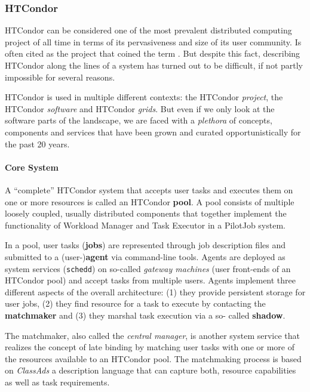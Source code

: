 \documentclass{sig-alternate}
\begin{document}
%
\subsubsection{HTCondor}

HTCondor can be considered one of the most prevalent distributed computing
project of all time in terms of its pervasiveness and size of its  user
community. Is often cited as the project that coined the term \pilotjob. But
despite this fact, describing HTCondor along the lines of a \pilotjob system has
turned out to be difficult, if not partly impossible for several reasons.

HTCondor is used in multiple different contexts: the HTCondor \textit{project},
the HTCondor \textit{software} and HTCondor \textit{grids}. But even if we only
look at the software parts of the landscape, we are faced with a
\textit{plethora} of concepts, components and services that have been grown and
curated opportunistically for the past 20 years.

%
\paragraph{Core System}

A ``complete'' HTCondor system that accepts user tasks and executes them on
one or more resources is called an HTCondor \textbf{pool}. A pool consists of
multiple loosely coupled, usually distributed  components that together
implement the functionality of Workload Manager and Task Executor in a
PilotJob system.

In a pool, user tasks (\textbf{jobs}) are represented through job description
files and submitted to a (user-)\textbf{agent} via command-line tools. Agents
are deployed as system services (\texttt{schedd}) on so-called \textit{gateway
machines} (user front-ends of an HTCondor pool) and accept tasks from multiple
users. Agents implement three different aspects of the overall architecture:
(1) they provide persistent storage for user jobs, (2) they find resource for
a task to execute by contacting the \textbf{matchmaker} and (3) they marshal
task execution via a so- called \textbf{shadow}.

The matchmaker, also called the \textit{central manager}, is another system
service that realizes the concept of late binding by matching user tasks with
one or more of the resources available to an HTCondor pool. The matchmaking
process is based on \textit{ClassAds} a description language that can capture
both, resource capabilities as well as task requirements.
\end{document}
